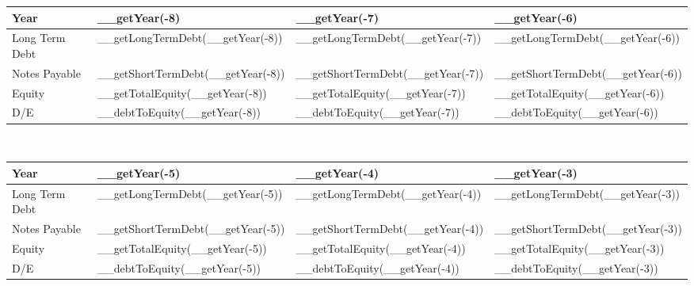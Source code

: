 \begin{tabularx}{\textwidth}{|X|X|X|X|}
 \hline
 Year                       & __getYear(-8)                        & __getYear(-7)                        & __getYear(-6)                     \\
 \hline
 Long Term Debt             & __getLongTermDebt(__getYear(-8))     & __getLongTermDebt(__getYear(-7))     & __getLongTermDebt(__getYear(-6))  \\
 Notes Payable              & __getShortTermDebt(__getYear(-8))    & __getShortTermDebt(__getYear(-7))    & __getShortTermDebt(__getYear(-6)) \\
 Equity                     & __getTotalEquity(__getYear(-8))      & __getTotalEquity(__getYear(-7))      & __getTotalEquity(__getYear(-6))   \\
 \rowcolor{lightgray} D/E   & __debtToEquity(__getYear(-8))        & __debtToEquity(__getYear(-7))        & __debtToEquity(__getYear(-6))     \\
 \hline
\end{tabularx}\\

\begin{tabularx}{\textwidth}{|X|X|X|X|}
 \hline
 Year                       & __getYear(-5)                        & __getYear(-4)                        & __getYear(-3)                     \\
 \hline
 Long Term Debt             & __getLongTermDebt(__getYear(-5))     & __getLongTermDebt(__getYear(-4))     & __getLongTermDebt(__getYear(-3))  \\
 Notes Payable              & __getShortTermDebt(__getYear(-5))    & __getShortTermDebt(__getYear(-4))    & __getShortTermDebt(__getYear(-3)) \\
 Equity                     & __getTotalEquity(__getYear(-5))      & __getTotalEquity(__getYear(-4))      & __getTotalEquity(__getYear(-3))   \\
 \rowcolor{lightgray} D/E   & __debtToEquity(__getYear(-5))        & __debtToEquity(__getYear(-4))        & __debtToEquity(__getYear(-3))     \\
 \hline
\end{tabularx}\\

